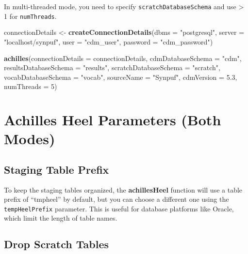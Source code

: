 \documentclass[]{article}
\newenvironment{Shaded}{\begin{snugshade}}{\end{snugshade}}
\newcommand{\KeywordTok}[1]{\textcolor[rgb]{0.13,0.29,0.53}{\textbf{#1}}}
\newcommand{\DataTypeTok}[1]{\textcolor[rgb]{0.13,0.29,0.53}{#1}}
\newcommand{\DecValTok}[1]{\textcolor[rgb]{0.00,0.00,0.81}{#1}}
\newcommand{\FloatTok}[1]{\textcolor[rgb]{0.00,0.00,0.81}{#1}}
\newcommand{\StringTok}[1]{\textcolor[rgb]{0.31,0.60,0.02}{#1}}
\newcommand{\NormalTok}[1]{#1}
\begin{document}
In multi-threaded mode, you need to specify
\texttt{scratchDatabaseSchema} and use \textgreater{} 1 for
\texttt{numThreads}.

\begin{Shaded}
\begin{Highlighting}[]
\NormalTok{connectionDetails <-}\StringTok{ }\KeywordTok{createConnectionDetails}\NormalTok{(}\DataTypeTok{dbms =} \StringTok{"postgresql"}\NormalTok{, }
                                             \DataTypeTok{server =} \StringTok{"localhost/synpuf"}\NormalTok{, }
                                             \DataTypeTok{user =} \StringTok{"cdm_user"}\NormalTok{, }
                                             \DataTypeTok{password =} \StringTok{"cdm_password"}\NormalTok{)}

\KeywordTok{achilles}\NormalTok{(}\DataTypeTok{connectionDetails =}\NormalTok{ connectionDetails, }
         \DataTypeTok{cdmDatabaseSchema =} \StringTok{"cdm"}\NormalTok{, }
         \DataTypeTok{resultsDatabaseSchema =} \StringTok{"results"}\NormalTok{, }
         \DataTypeTok{scratchDatabaseSchema =} \StringTok{"scratch"}\NormalTok{, }
         \DataTypeTok{vocabDatabaseSchema =} \StringTok{"vocab"}\NormalTok{, }
         \DataTypeTok{sourceName =} \StringTok{"Synpuf"}\NormalTok{, }
         \DataTypeTok{cdmVersion =} \FloatTok{5.3}\NormalTok{, }
         \DataTypeTok{numThreads =} \DecValTok{5}\NormalTok{)}
\end{Highlighting}
\end{Shaded}

\section{Achilles Heel Parameters (Both
Modes)}\label{achilles-heel-parameters-both-modes}

\subsection{Staging Table Prefix}\label{staging-table-prefix-1}

To keep the staging tables organized, the \textbf{achillesHeel} function
will use a table prefix of ``tmpheel'' by default, but you can choose a
different one using the \texttt{tempHeelPrefix} parameter. This is
useful for database platforms like Oracle, which limit the length of
table names.

\subsection{Drop Scratch Tables}\label{drop-scratch-tables-1}
\end{document}
